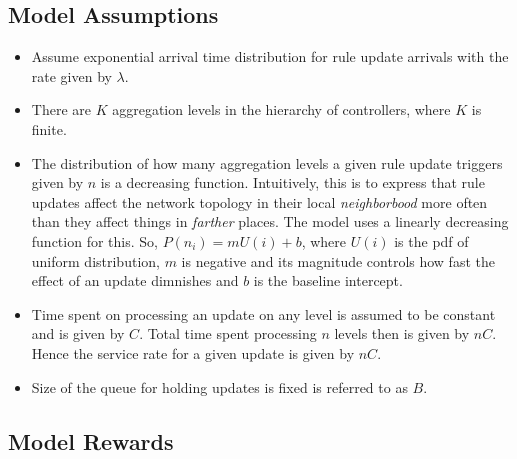 \documentclass[conference]{IEEEtran}
\begin{document}
\subsection{Model Assumptions}

\begin {itemize}
 \item Assume exponential arrival time distribution for rule update arrivals with the rate given by $\lambda$.
 \item There are $K$ aggregation levels in the hierarchy of controllers, where $K$ is finite. 
 \item The distribution of how many aggregation levels a given rule update triggers given by $n$ is a decreasing function. Intuitively, this is to express that rule updates affect the network topology in their local \textit{neighborbood} more often than they affect things in \textit{farther} places. The model uses a linearly decreasing function for this. So, $P(n_i) = mU(i) + b$, where $U(i)$ is the pdf of uniform distribution, $m$ is negative and its magnitude controls how fast the effect of an update dimnishes and $b$ is the baseline intercept.
 \item Time spent on processing an update on any level is assumed to be constant and is given by $C$. Total time spent processing $n$ levels then is given by $nC$. Hence the service rate for a given update is given by $nC$. 
 \item Size of the queue for holding updates is fixed is referred to as $B$.
 
%  
%  
%  

\end {itemize}

\subsection{Model Rewards}
\end{document}
